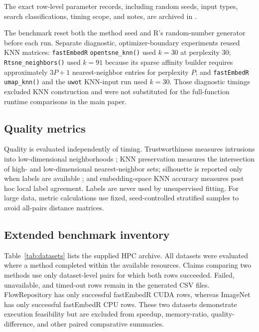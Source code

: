\documentclass[twoside,11pt]{article}
\newcommand{\pkg}{\texttt{fastEmbedR}}
\begin{document}
The exact row-level parameter records, including random seeds, input types,
search classifications, timing scope, and notes, are archived in
.

The benchmark reset both the method seed and R's random-number generator before each run. Separate
diagnostic, optimizer-boundary experiments reused KNN matrices: \pkg{}
\texttt{opentsne\_knn()} used $k=30$ at perplexity 30;
\texttt{Rtsne\_neighbors()} used $k=91$ because its sparse affinity builder
requires approximately $3P+1$ nearest-neighbor entries for perplexity $P$; and \pkg{}
\texttt{umap\_knn()} and the \texttt{uwot} KNN-input run used $k=30$.
Those diagnostic timings excluded KNN construction and were not substituted
for the full-function runtime comparisons in the main paper.

\subsection{Quality metrics}

Quality is evaluated independently of timing. Trustworthiness measures intrusions into low-dimensional neighborhoods \citep{venna2001}; KNN preservation measures the intersection of high- and low-dimensional nearest-neighbor sets; silhouette is reported only when labels are available \citep{rousseeuw1987}; and embedding-space KNN accuracy measures post hoc local label agreement. Labels are never used by unsupervised fitting. For large data, metric calculations use fixed, seed-controlled stratified samples to avoid all-pairs distance matrices.

\subsection{Extended benchmark inventory}

Table~\ref{tab:datasets} lists the supplied HPC archive. All datasets were evaluated where a method completed within the available resources. Claims comparing two methods use only dataset-level pairs for which both rows succeeded. Failed, unavailable, and timed-out rows remain in the generated CSV files. FlowRepository has only successful fastEmbedR CUDA rows, whereas ImageNet has only successful fastEmbedR CPU rows. These two datasets demonstrate execution feasibility but are excluded from speedup, memory-ratio, quality-difference, and other paired comparative summaries.
\end{document}

